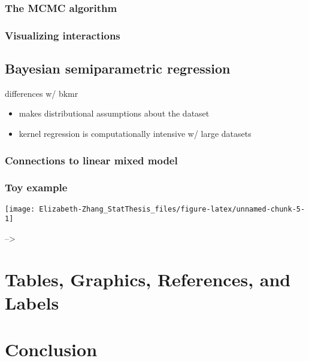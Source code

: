 \documentclass[12pt, twoside]{amherstthesis}
\providecommand{\tightlist}{%
  \setlength{\itemsep}{0pt}\setlength{\parskip}{0pt}}
\begin{document}
\hypertarget{the-mcmc-algorithm}{%
\subsection{The MCMC algorithm}\label{the-mcmc-algorithm}}

\hypertarget{visualizing-interactions}{%
\subsection{Visualizing interactions}\label{visualizing-interactions}}

\hypertarget{bayesian-semiparametric-regression}{%
\section{Bayesian semiparametric regression}\label{bayesian-semiparametric-regression}}

differences w/ bkmr
\begin{itemize}
\tightlist
\item
  makes distributional assumptions about the dataset
\item
  kernel regression is computationally intensive w/ large datasets
\end{itemize}
\hypertarget{connections-to-linear-mixed-model}{%
\subsection{Connections to linear mixed model}\label{connections-to-linear-mixed-model}}

\hypertarget{toy-example-1}{%
\subsection{Toy example}\label{toy-example-1}}
\begin{center}\texttt{[image: Elizabeth-Zhang\_StatThesis\_files/figure-latex/unnamed-chunk-5-1]} \end{center}

--\textgreater{}

\hypertarget{ref-labels}{%
\chapter{Tables, Graphics, References, and Labels}\label{ref-labels}}

\hypertarget{conclusion}{%
\chapter*{Conclusion}\label{conclusion}}
\end{document}
